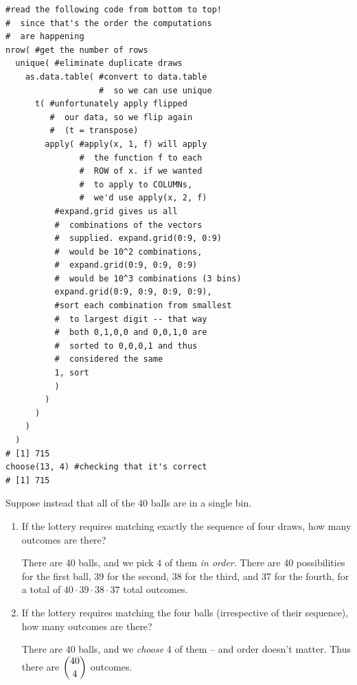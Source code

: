 \documentclass{article}
\newenvironment{solution}{\color{red}}{\color{black}}
\begin{document}
\begin{enumerate}
\begin{enumerate}
\begin{solution}
\begin{lstlisting}
#read the following code from bottom to top!
#  since that's the order the computations
#  are happening
nrow( #get the number of rows
  unique( #eliminate duplicate draws
    as.data.table( #convert to data.table
                   #  so we can use unique
      t( #unfortunately apply flipped
         #  our data, so we flip again
         #  (t = transpose)
        apply( #apply(x, 1, f) will apply
               #  the function f to each
               #  ROW of x. if we wanted
               #  to apply to COLUMNs,
               #  we'd use apply(x, 2, f)
          #expand.grid gives us all
          #  combinations of the vectors
          #  supplied. expand.grid(0:9, 0:9)
          #  would be 10^2 combinations,
          #  expand.grid(0:9, 0:9, 0:9)
          #  would be 10^3 combinations (3 bins)
          expand.grid(0:9, 0:9, 0:9, 0:9),
          #sort each combination from smallest
          #  to largest digit -- that way
          #  both 0,1,0,0 and 0,0,1,0 are
          #  sorted to 0,0,0,1 and thus
          #  considered the same
          1, sort
          )
        )
      )
    )
  )
# [1] 715
choose(13, 4) #checking that it's correct
# [1] 715
\end{lstlisting}
\end{solution}

\end{enumerate}
Suppose instead that all of the 40 balls are in a single bin.
\begin{enumerate}
\item If the lottery requires matching exactly the sequence of four draws, how many outcomes are there?

\begin{solution}
There are 40 balls, and we pick 4 of them \textit{in order}. There are 40 possibilities for the first ball, 39 for the second, 38 for the third, and 37 for the fourth, for a total of $40\cdot 39\cdot 38\cdot 37$ total outcomes. 
\end{solution}

\item If the lottery requires matching the four balls (irrespective of their sequence), how many outcomes are there?

\begin{solution}
There are 40 balls, and we \textit{choose} 4 of them -- and order doesn't matter. Thus there are $\dbinom{40}4$ outcomes.
\end{solution}

\end{enumerate}
\end{enumerate}
\end{document}

